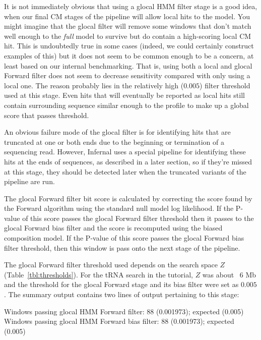 It is not immediately obvious that using a glocal HMM filter stage is
a good idea, when our final CM stages of the pipeline will allow local
hits to the model. You might imagine that the glocal filter will
remove some windows that don't match well enough to the \emph{full}
model to survive but do contain a high-scoring local CM hit. This is
undoubtedly true in some cases (indeed, we could certainly construct
examples of this) but it does not seem to be common enough to be a
concern, at least based on our internal benchmarking. That is, using
both a local and glocal Forward filter does not seem to decrease
sensitivity compared with only using a local one. The reason probably
lies in the relatively high ($0.005$) filter threshold used at this
stage. Even hits that will eventually be reported as local hits still
contain surrounding sequence similar enough to the profile to make up
a global score that passes threshold.

An obvious failure mode of the glocal filter is for identifying 
hits that are truncated at one or both ends due to the beginning or
termination of a sequencing read. However, Infernal uses a special
pipeline for identifying these hits at the ends of sequences, as
described in a later section, so if they're missed at this stage, they
should be detected later when the truncated variants of the
pipeline are run.

The glocal Forward filter bit score is calculated by correcting the
score found by the Forward algorithm using the standard null model log
likelihood. If the P-value of this score passes the glocal Forward
filter threshold then it passes to the glocal Forward bias filter and the
score is recomputed using the biased composition model. If the P-value
of this score passes the glocal Forward bias filter threshold, then this
window is pass onto the next stage of the pipeline.

The glocal Forward filter threshold used depends on
the search space $Z$ (Table~\ref{tbl:thresholds}). For the tRNA search
in the tutorial, $Z$ was about ~$6$ Mb and the threshold for the glocal
Forward stage and its bias filter were set as $0.005$. The summary
output contains two lines of output pertaining to this stage:

\begin{sreoutput}
Windows   passing glocal HMM Forward       filter:              88  (0.001973); expected (0.005)
Windows   passing glocal HMM Forward  bias filter:              88  (0.001973); expected (0.005)
\end{sreoutput}

